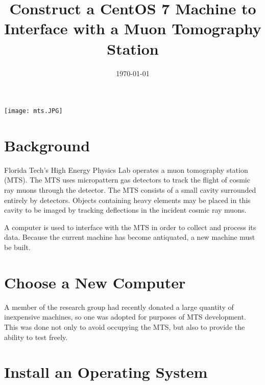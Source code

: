 \documentclass[12pt]{article}
\begin{document}

\title{Construct a CentOS 7 Machine to Interface with a Muon Tomography Station}

\date{\today}

\thispagestyle{empty}

\maketitle 

\begin{center}
  \texttt{[image: mts.JPG]}
\end{center}


\newpage


\tableofcontents

\newpage


\section{Background}

\qq Florida Tech's High Energy Physics Lab operates a muon tomography station
(MTS). The MTS uses micropattern gas detectors to track the flight of cosmic ray
muons through the detector. The MTS consists of a small cavity surrounded
entirely by detectors. Objects containing heavy elements may be placed in this
cavity to be imaged by tracking deflections in the incident cosmic ray muons.

\qq A computer is used to interface with the MTS in order to collect and process
its data. Because the current machine has become antiquated, a new machine must
be built.

\section{Choose a New Computer}

\qq A member of the research group had recently donated a large quantity of
inexpensive machines, so one was adopted for purposes of MTS development. This
was done not only to avoid occupying the MTS, but also to provide the ability to
test freely.

\section{Install an Operating System}
\end{document}
